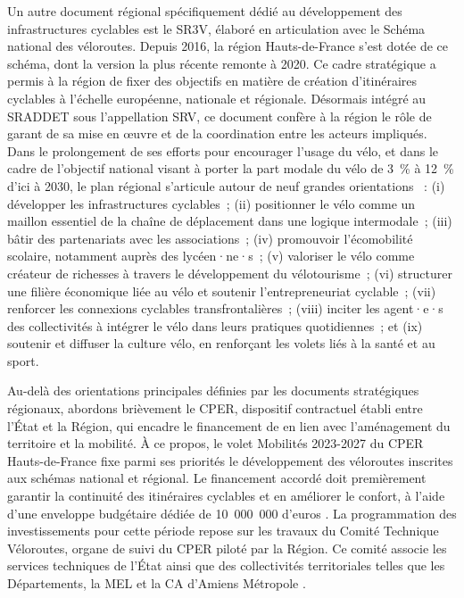 \begin{refsegment}
Un autre document régional spécifiquement dédié au développement des infrastructures cyclables est le \acrfull{SR3V}, élaboré en articulation avec le Schéma national des véloroutes. Depuis 2016, la région Hauts-de-France s’est dotée de ce schéma, dont la version la plus récente remonte à 2020. Ce cadre stratégique a permis à la région de fixer des objectifs en matière de création d’itinéraires cyclables à l’échelle européenne, nationale et régionale. Désormais intégré au \acrshort{SRADDET} sous l’appellation \acrfull{SRV}, ce document confère à la région le rôle de garant de sa mise en œuvre et de la coordination entre les acteurs impliqués. Dans le prolongement de ses efforts pour encourager l’usage du vélo, et dans le cadre de l’objectif national visant à porter la part modale du vélo de 3~\% à 12~\% d’ici à 2030, le plan régional s’articule autour de neuf grandes orientations \textcolor{blue}{\autocite[10]{region_hauts-de-france_plan_2023}}~: (i) développer les infrastructures cyclables~; (ii) positionner le vélo comme un maillon essentiel de la chaîne de déplacement dans une logique intermodale~; (iii) bâtir des partenariats avec les associations~; (iv) promouvoir l’écomobilité scolaire, notamment auprès des lycéen·ne·s~; (v) valoriser le vélo comme créateur de richesses à travers le développement du vélotourisme~; (vi) structurer une filière économique liée au vélo et soutenir l’entrepreneuriat cyclable~; (vii) renforcer les connexions cyclables transfrontalières~; (viii) inciter les agent·e·s des collectivités à intégrer le vélo dans leurs pratiques quotidiennes~; et (ix) soutenir et diffuser la culture vélo, en renforçant les volets liés à la santé et au sport.%

Au-delà des orientations principales définies par les documents stratégiques régionaux, abordons brièvement le \acrfull{CPER}, dispositif contractuel établi entre l'État et la Région, qui encadre le financement de  en lien avec l'aménagement du territoire et la mobilité. À ce propos, le volet Mobilités 2023-2027 du \acrshort{CPER} Hauts-de-France fixe parmi ses priorités le développement des véloroutes inscrites aux schémas national et régional. Le financement accordé doit premièrement garantir la continuité des itinéraires cyclables et en améliorer le confort, à l'aide d'une enveloppe budgétaire dédiée de 10~000~000 d’euros \textcolor{blue}{\autocite[87]{region_hauts-de-france_projet_2023}}. La programmation des investissements pour cette période repose sur les travaux du Comité Technique Véloroutes, organe de suivi du \acrshort{CPER} piloté par la Région. Ce comité associe les services techniques de l’État ainsi que des collectivités territoriales telles que les Départements, la \acrshort{MEL} et la \acrfull{CA} d’Amiens Métropole \textcolor{blue}{\autocite[88]{region_hauts-de-france_projet_2023}}.%


\end{refsegment}
